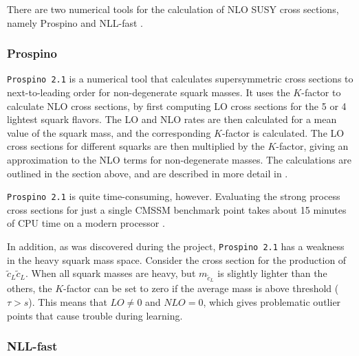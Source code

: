\documentclass[twoside,english]{uiofysmaster}
\begin{document}
There are two numerical tools for the calculation of NLO SUSY cross sections, namely Prospino \cite{beenakker1996prospino} and NLL-fast \cite{beenakker2016nlo+}.

\subsubsection{Prospino}\label{Sec:: susy hadron : Prospino}
\verb|Prospino 2.1| \cite{beenakker1996prospino} is a numerical tool that calculates supersymmetric cross sections to next-to-leading order for non-degenerate squark masses. It uses the $K$-factor to calculate NLO cross sections, by first computing LO cross sections for the 5 or 4 lightest squark flavors. The LO and NLO rates are then calculated for a mean value of the squark mass, and the corresponding $K$-factor is calculated. The LO cross sections for different squarks are then multiplied by the $K$-factor, giving an approximation to the NLO terms for non-degenerate masses. The calculations are outlined in the section above, and are described in more detail in \cite{beenakker1996prospino}. 

\verb|Prospino 2.1| is quite time-consuming, however. Evaluating the strong process cross sections for just a single CMSSM benchmark point takes about 15 minutes of CPU time on a modern processor \cite{balazs2017colliderbit}. 

In addition, as was discovered during the project, \verb|Prospino 2.1| has a weakness in the heavy squark mass space. Consider the cross section for the production of $\tilde{c}_L \tilde{c}_L$. When all squark masses are heavy, but $m_{\tilde{c}_L}$ is slightly lighter than the others, the $K$-factor can be set to zero if the average mass is above threshold ($\tau > s$). This means that $LO \neq 0$ and $NLO =0$, which gives problematic outlier points that cause trouble during learning.



\subsubsection{NLL-fast}
\end{document}
